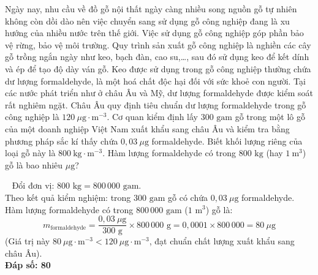 \documentclass[12pt,a4paper]{article}
\renewcommand{\loigiai}[1]{%
  \par\smallskip\noindent{\color{blue!80!black}\textbf{Lời giải:}}\ #1\par\smallskip
}
\begin{document}
\begin{ex}
Ngày nay, nhu cầu về đồ gỗ nội thất ngày càng nhiều song nguồn gỗ tự nhiên không còn dồi dào nên việc chuyển sang sử dụng gỗ công nghiệp đang là xu hướng của nhiều nước trên thế giới. Việc sử dụng gỗ công nghiệp góp phần bảo vệ rừng, bảo vệ môi trường. Quy trình sản xuất gỗ công nghiệp là nghiền các cây gỗ trồng ngắn ngày như keo, bạch đàn, cao su,\dots, sau đó sử dụng keo để kết dính và ép để tạo độ dày ván gỗ. Keo được sử dụng trong gỗ công nghiệp thường chứa dư lượng formaldehyde, là một hoá chất độc hại đối với sức khoẻ con người. Tại các nước phát triển như ở châu Âu và Mỹ, dư lượng formaldehyde được kiểm soát rất nghiêm ngặt. Châu Âu quy định tiêu chuẩn dư lượng formaldehyde trong gỗ công nghiệp là $120\ \mu\mathrm{g}\cdot\mathrm{m}^{-3}$. Cơ quan kiểm định lấy $300\text{ gam}$ gỗ trong một lô gỗ của một doanh nghiệp Việt Nam xuất khẩu sang châu Âu và kiểm tra bằng phương pháp sắc kí thấy chứa $0{,}03\ \mu\mathrm{g}$ formaldehyde. Biết khối lượng riêng của loại gỗ này là $800\ \mathrm{kg}\cdot\mathrm{m}^{-3}$. Hàm lượng formaldehyde có trong $800\text{ kg}$ (hay $1\ \mathrm{m}^3$) gỗ là bao nhiêu $\mu\mathrm{g}$?
\par{}
\loigiai{
Đổi đơn vị: $800\text{ kg} = 800\,000\text{ gam}$.\\
Theo kết quả kiểm nghiệm: trong $300\text{ gam}$ gỗ có chứa $0{,}03\ \mu\text{g}$ formaldehyde.\\
Hàm lượng formaldehyde có trong $800\,000\text{ gam}$ ($1\text{ m}^3$) gỗ là:
$$m_{\text{formaldehyde}} = \frac{0{,}03\ \mu\text{g}}{300\text{ g}} \times 800\,000\text{ g} = 0{,}0001 \times 800\,000 = 80\ \mu\text{g}$$
(Giá trị này $80\ \mu\mathrm{g}\cdot\mathrm{m}^{-3} < 120\ \mu\mathrm{g}\cdot\mathrm{m}^{-3}$, đạt chuẩn chất lượng xuất khẩu sang châu Âu).\\
\textbf{Đáp số: 80}
}
\end{ex}
\end{document}
